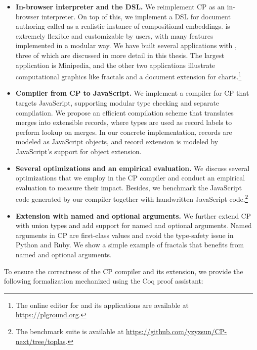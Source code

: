 \begin{itemize}
\item \textbf{In-browser interpreter and the \ExT DSL.} We reimplement CP as an
      in-browser interpreter. On top of this, we implement a DSL for document
      authoring called \ExT as a realistic instance of compositional embeddings.
      \ExT is extremely flexible and customizable by users, with many features
      implemented in a modular way. We have built several applications with
      \ExT, three of which are discussed in more detail in this thesis. The
      largest application is Minipedia, and the other two applications
      illustrate computational graphics like fractals and a document extension
      for charts.\footnote{The online editor for \ExT and its applications are
      available at \url{https://plground.org}.}
\item \textbf{Compiler from CP to JavaScript.} We implement a compiler for CP
      that targets JavaScript, supporting modular type checking and separate
      compilation. We propose an efficient compilation scheme that translates
      merges into extensible records, where types are used as record labels to
      perform lookup on merges. In our concrete implementation, records are
      modeled as JavaScript objects, and record extension is modeled by
      JavaScript's support for object extension.
\item \textbf{Several optimizations and an empirical evaluation.} We discuss
      several optimizations that we employ in the CP compiler and conduct an
      empirical evaluation to measure their impact. Besides, we benchmark the
      JavaScript code generated by our compiler together with handwritten
      JavaScript code.\footnote{The benchmark suite is available at
      \url{https://github.com/yzyzsun/CP-next/tree/toplas}.}
\item \textbf{Extension with named and optional arguments.} We further extend CP
      with union types and add support for named and optional arguments. Named
      arguments in CP are first-class values and avoid the type-safety issue in
      Python and Ruby. We show a simple example of fractals that benefits from
      named and optional arguments.
\end{itemize}
To ensure the correctness of the CP compiler and its extension, we provide the
following formalization mechanized using the Coq proof assistant:
